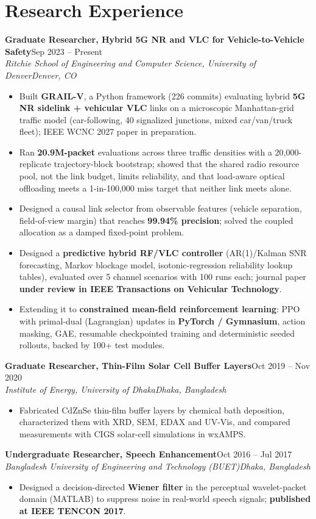 \documentclass[10pt,letterpaper]{article}
\newcommand{\entry}[4]{\textbf{#1}\hfill #2\\\textit{#3}\hfill\textit{#4}\par}
\begin{document}
\section*{Research Experience}
\entry{Graduate Researcher, Hybrid 5G NR and VLC for Vehicle-to-Vehicle Safety}{Sep 2023 – Present}{Ritchie School of Engineering and Computer Science, University of Denver}{Denver, CO}
\begin{itemize}\item Built \textbf{GRAIL-V}, a Python framework (226 commits) evaluating hybrid \textbf{5G NR sidelink + vehicular VLC} links on a microscopic Manhattan-grid traffic model (car-following, 40 signalized junctions, mixed car/van/truck fleet); IEEE WCNC 2027 paper in preparation.\item Ran \textbf{20.9M-packet} evaluations across three traffic densities with a 20,000-replicate trajectory-block bootstrap; showed that the shared radio resource pool, not the link budget, limits reliability, and that load-aware optical offloading meets a 1-in-100,000 miss target that neither link meets alone.\item Designed a causal link selector from observable features (vehicle separation, field-of-view margin) that reaches \textbf{99.94\% precision}; solved the coupled allocation as a damped fixed-point problem.\item Designed a \textbf{predictive hybrid RF/VLC controller} (AR(1)/Kalman SNR forecasting, Markov blockage model, isotonic-regression reliability lookup tables), evaluated over 5 channel scenarios with 100 runs each; journal paper \textbf{under review in IEEE Transactions on Vehicular Technology}.\item Extending it to \textbf{constrained mean-field reinforcement learning}: PPO with primal-dual (Lagrangian) updates in \textbf{PyTorch / Gymnasium}, action masking, GAE, resumable checkpointed training and deterministic seeded rollouts, backed by 100+ test modules.\end{itemize}
\vspace{2pt}
\entry{Graduate Researcher, Thin-Film Solar Cell Buffer Layers}{Oct 2019 – Nov 2020}{Institute of Energy, University of Dhaka}{Dhaka, Bangladesh}
\begin{itemize}\item Fabricated CdZnSe thin-film buffer layers by chemical bath deposition, characterized them with XRD, SEM, EDAX and UV-Vis, and compared measurements with CIGS solar-cell simulations in wxAMPS.\end{itemize}
\vspace{2pt}
\entry{Undergraduate Researcher, Speech Enhancement}{Oct 2016 – Jul 2017}{Bangladesh University of Engineering and Technology (BUET)}{Dhaka, Bangladesh}
\begin{itemize}\item Designed a decision-directed \textbf{Wiener filter} in the perceptual wavelet-packet domain (MATLAB) to suppress noise in real-world speech signals; \textbf{published at IEEE TENCON 2017}.\end{itemize}
\vspace{2pt}
\end{document}
